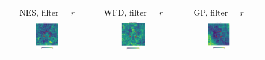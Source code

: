 \documentclass[preprintm,linenumbers]{aastex631}
\begin{document}
  
  	\begin{figure}
			\centering
			\begin{tabular}{  c c c}
                 NES, filter = $r$ & WFD, filter = $r$ & GP, filter = $r$ \\
				\includegraphics[width=0.3\textwidth]{results/skymaps_cutout/skymaps_cutout_first_year_one_snap_v4_0_10yrs_db_noDD_noTwi_nside-256_CountMetric_r_NES_noDD_noTwi.pdf} &
				\includegraphics[width=0.3\textwidth]{results/skymaps_cutout/skymaps_cutout_first_year_one_snap_v4_0_10yrs_db_noDD_noTwi_nside-256_CountMetric_r_WFD_noDD_noTwi.pdf} &
				\includegraphics[width=0.3\textwidth]{results/skymaps_cutout/skymaps_cutout_first_year_one_snap_v4_0_10yrs_db_noDD_noTwi_nside-256_CountMetric_r_GP_noDD_noTwi.pdf} \\

\end{tabular}
\end{figure}
\end{document}
